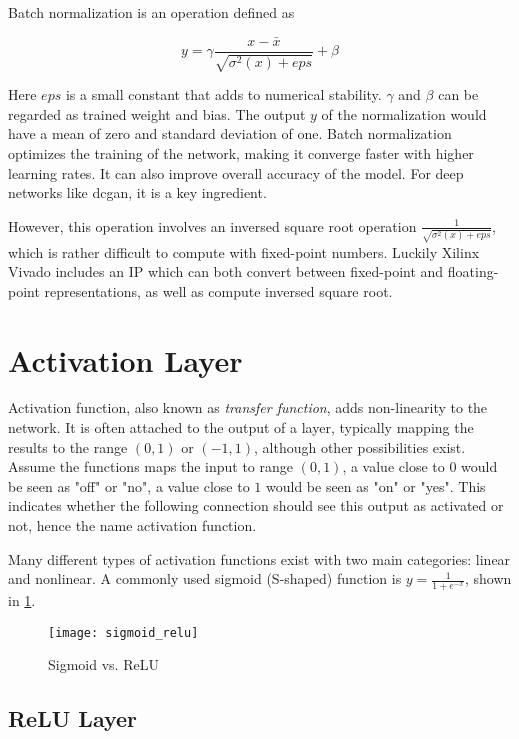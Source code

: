 Batch normalization is an operation defined as

\begin{equation} \label{eq:batch_normalization}
  y = \gamma \frac{x - \bar{x}}{\sqrt{\sigma^2(x) + {eps}}} + \beta
\end{equation}

Here $eps$ is a small constant that adds to numerical stability. $\gamma$ and $\beta$ can be regarded
as trained weight and bias. The output $y$ of the normalization would have a mean of zero and standard
deviation of one. Batch normalization optimizes the training of the network, making it converge
faster with higher learning rates. It can also improve overall accuracy of the model. For deep networks
like \gls{dcgan}, it is a key ingredient.

However, this operation involves an inversed square root operation $\frac{1}{\sqrt{\sigma^2(x) + eps}}$,
which is rather difficult to compute with fixed-point numbers. Luckily Xilinx Vivado includes an IP which
can both convert between fixed-point and floating-point representations, as well as compute inversed square
root.

\section{Activation Layer}

Activation function, also known as \textit{transfer function}, adds non-linearity to the network. It is often
attached to the output of a layer, typically mapping the results to the range $(0, 1)$ or $(-1, 1)$, although
other possibilities exist. Assume the functions maps the input to range $(0, 1)$, a value close to $0$ would
be seen as "off" or "no", a value close to $1$ would be seen as "on" or "yes". This indicates whether the
following connection should see this output as activated or not, hence the name activation function.

Many different types of activation functions exist with two main categories: linear and nonlinear. A commonly
used sigmoid (S-shaped) function is $y = \frac{1}{1 + e^{-x}}$, shown in \ref{fig:sigmoid_relu}.

\begin{figure}[h]
  \centering
  \texttt{[image: sigmoid\_relu]}
  \caption{Sigmoid vs. ReLU}
  \label{fig:sigmoid_relu}
\end{figure}

\subsection{ReLU Layer}

